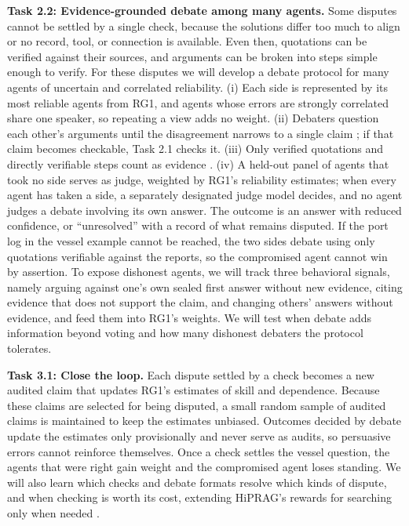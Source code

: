 \documentclass[11pt,letterpaper]{article}
\newcommand{\rg}[1]{\par\smallskip{\normalfont\bfseries\itshape #1}\par}
\newcommand{\task}[1]{\textbf{#1}\hspace{0.4em}}
\begin{document}
\task{Task 2.2: Evidence-grounded debate among many agents.} Some disputes cannot be settled by a single check, because the solutions differ too much to align or no record, tool, or connection is available. Even then, quotations can be verified against their sources, and arguments can be broken into steps simple enough to verify. For these disputes we will develop a debate protocol for many agents of uncertain and correlated reliability. (i) Each side is represented by its most reliable agents from RG1, and agents whose errors are strongly correlated share one speaker, so repeating a view adds no weight. (ii) Debaters question each other's arguments until the disagreement narrows to a single claim \cite{irving2018debate}; if that claim becomes checkable, Task 2.1 checks it. (iii) Only verified quotations and directly verifiable steps count as evidence \cite{khan2024debating}. (iv) A held-out panel of agents that took no side serves as judge, weighted by RG1's reliability estimates; when every agent has taken a side, a separately designated judge model decides, and no agent judges a debate involving its own answer. The outcome is an answer with reduced confidence, or ``unresolved'' with a record of what remains disputed. If the port log in the vessel example cannot be reached, the two sides debate using only quotations verifiable against the reports, so the compromised agent cannot win by assertion. To expose dishonest agents, we will track three behavioral signals, namely arguing against one's own sealed first answer without new evidence, citing evidence that does not support the claim, and changing others' answers without evidence, and feed them into RG1's weights. We will test when debate adds information beyond voting and how many dishonest debaters the protocol tolerates.

\rg{RG3. Learn from verified outcomes}
\task{Task 3.1: Close the loop.} Each dispute settled by a check becomes a new audited claim that updates RG1's estimates of skill and dependence. Because these claims are selected for being disputed, a small random sample of audited claims is maintained to keep the estimates unbiased. Outcomes decided by debate update the estimates only provisionally and never serve as audits, so persuasive errors cannot reinforce themselves. Once a check settles the vessel question, the agents that were right gain weight and the compromised agent loses standing. We will also learn which checks and debate formats resolve which kinds of dispute, and when checking is worth its cost, extending HiPRAG's rewards for searching only when needed \cite{wu2026hiprag}.
\end{document}
